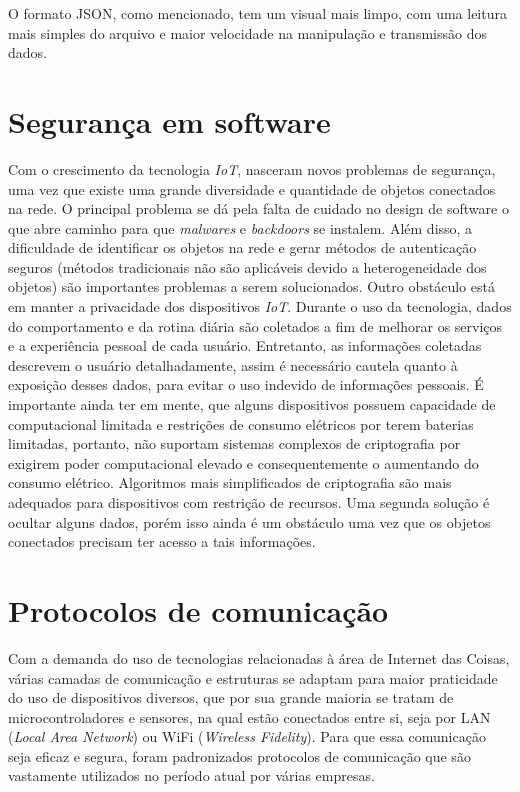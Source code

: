 \documentclass[../../layout.tex]{subfiles}
\begin{document}
O formato JSON, como mencionado, tem um visual mais limpo, com uma leitura mais simples do arquivo e maior velocidade na manipulação e transmissão dos dados.

\section{Segurança em software}
\hspace*{3em}Com o crescimento da tecnologia \emph{IoT}, nasceram novos problemas de segurança, uma vez que existe uma grande diversidade e quantidade de objetos conectados na rede. O principal problema se dá pela falta de cuidado no design de software o que abre caminho para que \emph{malwares} e \emph{backdoors} se instalem. Além disso, a dificuldade de identificar os objetos na rede e gerar métodos de autenticação seguros (métodos tradicionais não são aplicáveis devido a heterogeneidade dos objetos) são importantes problemas a serem solucionados. Outro obstáculo está em manter a privacidade dos dispositivos \emph{IoT}. Durante o uso da tecnologia, dados do comportamento e da rotina diária são coletados a fim de melhorar os serviços e a experiência pessoal de cada usuário. Entretanto, as informações coletadas descrevem o usuário detalhadamente, assim é necessário cautela quanto à exposição desses dados, para evitar o uso indevido de informações pessoais. 
É importante ainda ter em mente, que alguns dispositivos possuem capacidade de computacional limitada e restrições de consumo elétricos por terem  baterias limitadas, portanto, não suportam  sistemas complexos de criptografia por exigirem poder computacional elevado e consequentemente o aumentando do consumo elétrico. Algoritmos mais simplificados de criptografia são mais adequados para dispositivos com restrição de recursos. Uma segunda solução é ocultar alguns dados, porém isso ainda é um obstáculo uma vez que os objetos conectados precisam ter acesso a tais informações. \cite{seguranca}

\section{Protocolos de comunicação}
\hspace*{3em}Com a demanda do uso de tecnologias relacionadas à área de Internet das Coisas, várias camadas de comunicação e estruturas se adaptam para maior praticidade do uso de dispositivos diversos, que por sua grande maioria se tratam de microcontroladores e sensores, na qual estão conectados entre si, seja por LAN (\emph{Local Area Network}) ou WiFi (\emph{Wireless Fidelity}). Para que essa comunicação seja eficaz e segura, foram padronizados protocolos de comunicação que são vastamente utilizados no período atual por várias empresas.
\end{document}
